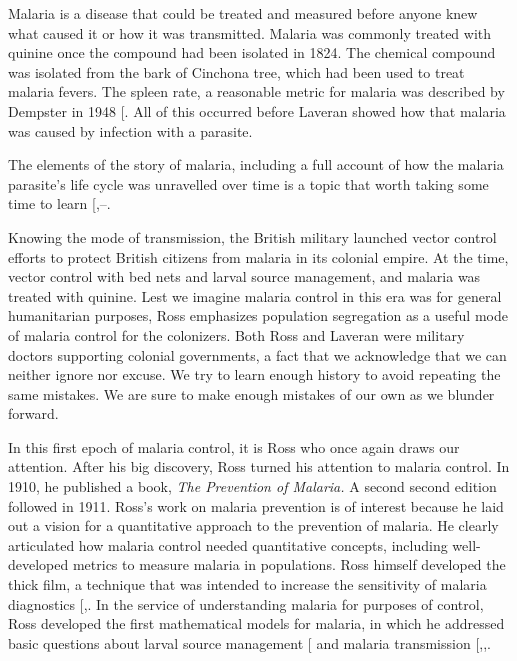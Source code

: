 \documentclass[
]{book}
\begin{document}
Malaria is a disease that could be treated and measured before anyone knew what caused it or how it was transmitted.
Malaria was commonly treated with quinine once the compound had been isolated in 1824.
The chemical compound was isolated from the bark of Cinchona tree, which had been used to treat malaria fevers.
The spleen rate, a reasonable metric for malaria was described by Dempster in 1948 {[}\citeproc{ref-Dempster1848SpleenRate}{22}{]}.
All of this occurred before Laveran showed how that malaria was caused by infection with a parasite.

The elements of the story of malaria, including a full account of
how the malaria parasite's life cycle was unravelled over time is a topic that worth taking some time to learn {[},--\citeproc{ref-CoxFEG2010HistoryDiscovery}{25}{]}.

Knowing the mode of transmission, the British military launched vector control efforts to protect British citizens from malaria in its colonial empire.
At the time, vector control with bed nets and larval source management, and malaria was treated with quinine.
Lest we imagine malaria control in this era was for general humanitarian purposes, Ross emphasizes population segregation as a useful mode of malaria control for the colonizers.
Both Ross and Laveran were military doctors supporting colonial governments, a fact that we acknowledge that we can neither ignore nor excuse.
We try to learn enough history to avoid repeating the same mistakes.
We are sure to make enough mistakes of our own as we blunder forward.

In this first epoch of malaria control, it is Ross who once again draws our attention.
After his big discovery, Ross turned his attention to malaria control. In 1910,
he published a book, \emph{The Prevention of Malaria.} A second second edition followed in 1911.
Ross's work on malaria prevention is of interest because he laid out a vision for a quantitative approach to the prevention of malaria.
He clearly articulated how malaria control needed quantitative concepts, including well-developed metrics to measure malaria in populations.
Ross himself developed the thick film, a technique that was intended to increase the sensitivity of malaria diagnostics {[},\citeproc{ref-RossR1903ImprovedMethod}{27}{]}.
In the service of understanding malaria for purposes of control, Ross developed the first mathematical models for malaria, in which he addressed basic questions about larval source management {[}\citeproc{ref-RossR1905LogicalBasis}{12}{]} and malaria transmission {[},,\citeproc{ref-RossR1911Nature}{28}{]}.
\end{document}
